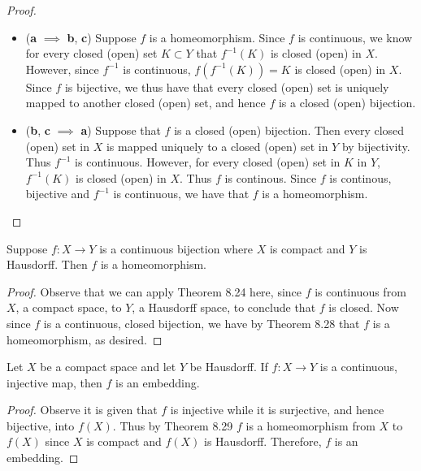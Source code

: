 \documentclass[letter,12pt,twoside]{hmcpset}
\begin{document}
\begin{proof}
    \begin{itemize}
        \item (\textbf{a} $\implies$ \textbf{b}, \textbf{c})
        Suppose $f$ is a homeomorphism. Since $f$ is continuous, we
        know for every closed (open) set $K \subset Y$ that
        $f^{-1}(K)$ is closed (open)
        in $X$. However, since $f^{-1}$ is continuous, $f(f^{-1}(K)) = K$
        is closed (open) in $X$. Since $f$ is bijective, we thus have that every
        closed (open) set is uniquely mapped to  another closed (open)
        set, and hence $f$ is a closed (open) bijection.

        \item (\textbf{b}, \textbf{c} $\implies$ \textbf{a})
        Suppose that $f$ is a closed (open) bijection. Then every
        closed (open) set in $X$ is mapped uniquely to a closed (open)
        set in
        $Y$ by bijectivity. Thus $f^{-1}$ is continuous.
        However, for every closed (open) set in $K$ in
        $Y$, $f^{-1}(K)$ is closed (open) in $X$. Thus $f$ is continous.
        Since $f$ is continous, bijective and $f^{-1}$ is continuous,
        we have that $f$ is a homeomorphism.
    \end{itemize}
\end{proof}

\begin{problem}[Theorem 8.29]
    Suppose $f: X \to Y$ is a continuous bijection where $X$ is
    compact and $Y$ is Hausdorff. Then $f$ is a homeomorphism.
\end{problem}

\begin{proof}
    Observe that we can apply Theorem 8.24 here, since $f$ is
    continuous from $X$, a compact space, to $Y$, a Hausdorff space,
    to conclude that $f$ is closed. Now since $f$ is a continuous,
    closed bijection, we have by Theorem 8.28 that $f$ is a
    homeomorphism, as desired.
\end{proof}

\begin{problem}[Theorem 8.29]
    Let $X$ be a compact space and let $Y$ be Hausdorff. If $f: X \to
    Y$ is a continuous, injective map, then $f$ is an embedding.
\end{problem}

\begin{proof}
    Observe it is given that $f$ is injective while it is 
    surjective, and hence bijective, into $f(X)$. Thus by Theorem 8.29
    $f$ is a homeomorphism from $X$ to $f(X)$ since $X$ is 
    compact and $f(X)$ is Hausdorff. Therefore, $f$ is an embedding. 
\end{proof}
\end{document}
